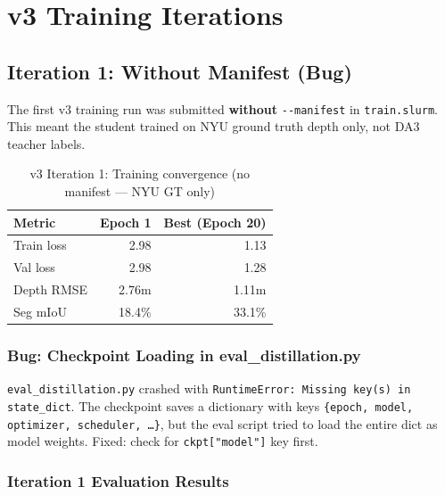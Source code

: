 \documentclass[11pt,a4paper]{article}
\begin{document}
\section{v3 Training Iterations}
\label{sec:v3-training}

\subsection{Iteration 1: Without Manifest (Bug)}

The first v3 training run was submitted \textbf{without}
\texttt{-{}-manifest} in \texttt{train.slurm}. This meant the student
trained on NYU ground truth depth only, not DA3 teacher labels.

\begin{table}[h]
\centering
\caption{v3 Iteration 1: Training convergence (no manifest --- NYU GT only)}
\label{tab:v3-iter1-train}
\begin{tabular}{lrr}
\toprule
\textbf{Metric} & \textbf{Epoch 1} & \textbf{Best (Epoch 20)} \\
\midrule
Train loss     & 2.98  & 1.13  \\
Val loss       & 2.98  & 1.28  \\
Depth RMSE     & 2.76m & 1.11m \\
Seg mIoU       & 18.4\% & 33.1\% \\
\bottomrule
\end{tabular}
\end{table}

\subsubsection{Bug: Checkpoint Loading in eval\_distillation.py}

\texttt{eval\_distillation.py} crashed with \texttt{RuntimeError: Missing
key(s) in state\_dict}. The checkpoint saves a dictionary with keys
\texttt{\{epoch, model, optimizer, scheduler, \ldots\}}, but the eval
script tried to load the entire dict as model weights. Fixed: check for
\texttt{ckpt["model"]} key first.

\subsubsection{Iteration 1 Evaluation Results}
\end{document}

